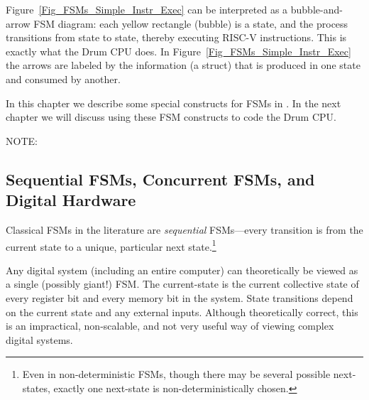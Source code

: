
Figure~\ref{Fig_FSMs_Simple_Instr_Exec} can be interpreted as a
bubble-and-arrow FSM diagram: each yellow rectangle (bubble) is a
state, and the process transitions from state to state, thereby
executing RISC-V instructions.  This is exactly what the Drum CPU
does.  In Figure~\ref{Fig_FSMs_Simple_Instr_Exec} the arrows are
labeled by the information (a struct) that is produced in one state
and consumed by another.

In this chapter we describe some special constructs for FSMs in {\BSV}.
In the next chapter we will discuss using these FSM constructs to code
the Drum CPU.

\vspace{2ex}

NOTE: 


\subsection{Sequential FSMs, Concurrent FSMs, and Digital Hardware}


Classical FSMs in the literature are \emph{sequential} FSMs---every
transition is from the current state to a unique, particular next
state.\footnote{Even in non-deterministic FSMs, though there may be
several possible next-states, exactly one next-state is
non-deterministically chosen.}

Any digital system (including an entire computer) can theoretically be
viewed as a single (possibly giant!) FSM.  The current-state is the
current collective state of every register bit and every memory bit in
the system.  State transitions depend on the current state and any
external inputs.  Although theoretically correct, this is an
impractical, non-scalable, and not very useful way of viewing complex
digital systems.

